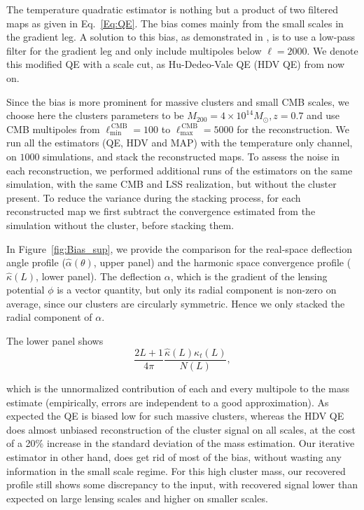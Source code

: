\documentclass[prd, superscriptaddress, tightenlines, longbibliography, nofootinbib, eqsecnum, amsfonts, amsmath, floatfix, twocolumn, notitlepage]{revtex4-2}
\newcommand{\JC}[1]{\color{purple}{{JC:#1}}\color{black}\xspace}
\begin{document}
The temperature quadratic estimator is nothing but a product of two filtered maps as given in Eq.~\ref{Eq:QE}. The bias comes mainly from the small scales in the gradient leg. 
A solution to this bias, as demonstrated in \cite{Hu:2007bt}, is to use a low-pass filter for the gradient leg and only include multipoles below $\ell=2000$. We denote this modified QE with a scale cut, as Hu-Dedeo-Vale QE (HDV QE) from now on.

Since the bias is more prominent for massive clusters and small CMB scales, we choose here the clusters parameters to be $M_{200} = 4 \times 10^{14} M_{\odot}, z=0.7$ and use CMB multipoles from $\ell_{\text{min}}^{\, \text{CMB}}=100$ to $\ell_{\text{max}}^{\, \text{CMB}} = 5000$ for the reconstruction.
We run all the estimators (QE, HDV and MAP) with the temperature only channel, on $1000$ simulations, and stack the reconstructed maps.
To assess the noise in each reconstruction, we performed additional runs of the estimators on the same simulation, with the same CMB and LSS realization, but without the cluster present. To reduce the variance during the stacking process, for each reconstructed map we first subtract the convergence estimated from the simulation without the cluster, before stacking them.

In Figure~\ref{fig:Bias_sup}, we provide the comparison for the real-space deflection angle profile ($\hat \alpha(\theta)$, upper panel)  and the harmonic space convergence profile ($\hat \kappa(L)$, lower panel). 
The deflection $\alpha$, which is the gradient of the lensing potential $\phi$ is a vector quantity, but only its radial component is non-zero on average, since our clusters are circularly symmetric. 
Hence we only stacked the radial component of $\alpha$.

The lower panel shows
\begin{equation}
	\frac{2L + 1}{4\pi} \frac{\hat \kappa(L) \kappa_t(L)}{N(L)},
\end{equation}


which is the unnormalized contribution of each and every multipole to the mass estimate (empirically, errors are independent to a good approximation). As expected the QE is biased low for such massive clusters, whereas the HDV QE~\cite{Hu:2007bt} does almost unbiased reconstruction of the cluster signal on all scales, at the cost of a 20\% increase in the standard deviation of the mass estimation.
Our iterative estimator in other hand, does get rid of most of the bias, without wasting any information in the small scale regime. For this high cluster mass, our recovered profile still shows some discrepancy to the input, with recovered signal lower than expected on large lensing scales and higher on smaller scales.
\end{document}
